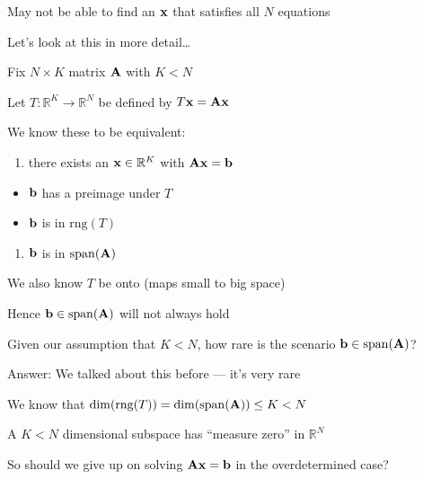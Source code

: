 \documentclass[letterpaper,10pt,english]{jupyterBook}
\begin{document}
\sphinxAtStartPar
May not be able to find an \({\bf x}\) that satisfies all \(N\) equations

\sphinxAtStartPar
Let’s look at this in more detail…

\sphinxAtStartPar
Fix \(N \times K\) matrix \({\bf A}\) with \(K < N\)

\sphinxAtStartPar
Let \(T \colon \mathbb{R}^K \to \mathbb{R}^N\) be defined by \(T {\bf x} = {\bf A} {\bf x}\)

\sphinxAtStartPar
We know these to be equivalent:
\begin{enumerate}
%
\item {} 
\sphinxAtStartPar
there exists an \({\bf x} \in \mathbb{R}^K\) with \({\bf A} {\bf x} = {\bf b}\)

\end{enumerate}
\begin{itemize}
\item {} 
\sphinxAtStartPar
\({\bf b}\) has a preimage under \(T\)

\item {} 
\sphinxAtStartPar
\({\bf b}\) is in \(\mathrm{rng}(T)\)

\end{itemize}
\begin{enumerate}
%
\setcounter{enumi}{8}
\item {} 
\sphinxAtStartPar
\({\bf b}\) is in \(\mathrm{span}({\bf A})\)

\end{enumerate}

\sphinxAtStartPar
We also know \(T\)  be onto (maps small to big space)

\sphinxAtStartPar
Hence \({\bf b} \in \mathrm{span}({\bf A})\) will not always hold

\sphinxAtStartPar
Given our assumption that \(K < N\), how rare is the scenario \({\bf b} \in
\mathrm{span}({\bf A})\)?

\sphinxAtStartPar
Answer: We talked about this before — it’s very rare

\sphinxAtStartPar
We know that \(\dim(\mathrm{rng}(T)) = \dim(\mathrm{span}({\bf A})) \leq K < N\)

\sphinxAtStartPar
A \(K < N\) dimensional subspace has “measure zero” in \(\mathbb{R}^N\)

\sphinxAtStartPar
So should we give up on solving \({\bf A} {\bf x} = {\bf b}\) in the
overdetermined case?
\end{document}
